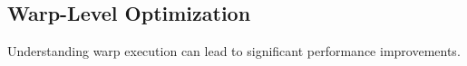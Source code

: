 \subsection{Warp-Level Optimization}

Understanding warp execution can lead to significant performance improvements.

